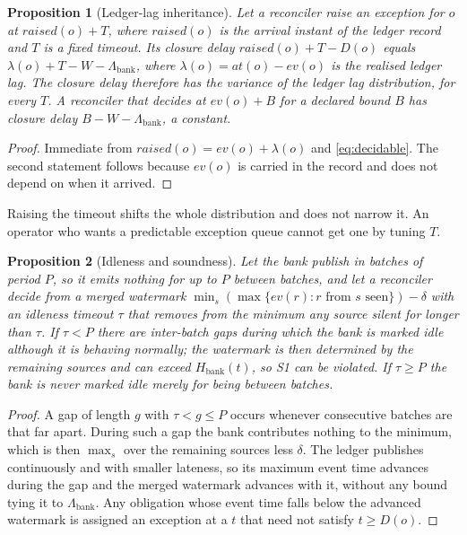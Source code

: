 \documentclass[10pt,conference]{IEEEtran}
\newtheorem{proposition}{Proposition}
\begin{document}
\begin{proposition}[Ledger-lag inheritance]
\label{prop:inherit}
Let a reconciler raise an exception for $o$ at $\mathit{raised}(o) + T$, where
$\mathit{raised}(o)$ is the arrival instant of the ledger record and $T$ is a
fixed timeout. Its closure delay $\mathit{raised}(o) + T - D(o)$ equals
$\lambda(o) + T - W - \Lambda_{\mathrm{bank}}$, where
$\lambda(o) = \mathit{at}(o) - \mathit{ev}(o)$ is the realised ledger lag. The
closure delay therefore has the variance of the ledger lag distribution, for
every $T$. A reconciler that decides at $\mathit{ev}(o) + B$ for a declared
bound $B$ has closure delay $B - W - \Lambda_{\mathrm{bank}}$, a constant.
\end{proposition}

\begin{proof}
Immediate from $\mathit{raised}(o) = \mathit{ev}(o) + \lambda(o)$ and
\eqref{eq:decidable}. The second statement follows because $\mathit{ev}(o)$ is
carried in the record and does not depend on when it arrived.
\end{proof}

Raising the timeout shifts the whole distribution and does not narrow it. An
operator who wants a predictable exception queue cannot get one by tuning $T$.

\begin{proposition}[Idleness and soundness]
\label{prop:idle}
Let the bank publish in batches of period $P$, so it emits nothing for up to $P$
between batches, and let a reconciler decide from a merged watermark
$\min_s (\max \{\mathit{ev}(r) : r \text{ from } s \text{ seen}\}) - \delta$
with an idleness timeout $\tau$ that removes from the minimum any source silent
for longer than $\tau$. If $\tau < P$ there are inter-batch gaps during which
the bank is marked idle although it is behaving normally; the watermark is then
determined by the remaining sources and can exceed $H_{\mathrm{bank}}(t)$, so
S1 can be violated. If $\tau \ge P$ the bank is never marked idle merely for
being between batches.
\end{proposition}

\begin{proof}
A gap of length $g$ with $\tau < g \le P$ occurs whenever consecutive batches
are that far apart. During such a gap the bank contributes nothing to the
minimum, which is then $\max_s$ over the remaining sources less $\delta$. The
ledger publishes continuously and with smaller lateness, so its maximum event
time advances during the gap and the merged watermark advances with it, without
any bound tying it to $\Lambda_{\mathrm{bank}}$. Any obligation whose event time
falls below the advanced watermark is assigned an exception at a $t$ that need
not satisfy $t \ge D(o)$.
\end{proof}
\end{document}
